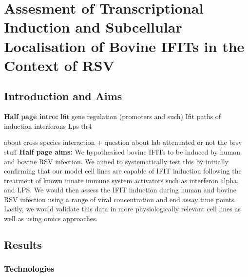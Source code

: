 \chapter{Assesment of Transcriptional Induction and Subcellular Localisation of Bovine IFITs in the Context of RSV} \label{Assesment of Transcriptional Induction and Subcellular Localisation of Bovine IFITs in the Context of RSV}
\section{Introduction and Aims} \label{Introduction and Aims Chapter2}
\textbf{Half page intro:}
Ifit gene regulation (promoters and such) \newline
Ifit paths of induction \newline
interferons \newline
Lps tlr4 \newline

about cross species interaction + question about lab attenuated or not the brsv stuff
\textbf{Half page aims:}
We hypothesised  bovine IFITs to be induced by human and bovine RSV infection. We aimed to systematically test this by initially confirming that our model cell lines are capable of IFIT induction following the treatment of known innate immune system activators such as interferon alpha, and LPS. We would then assess the IFIT induction during human and bovine RSV infection using a range of viral concentration and end assay time points. Lastly, we would validate this data in more physiologically relevant cell lines as well as using omics approaches.

\section{Results} \label{Results Chapter2}
\subsection{Technologies} \label{Technologies}
